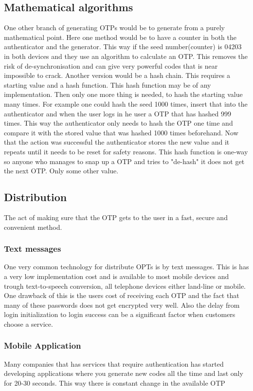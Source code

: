 \documentclass{article}
\begin{document}
            \subsection{Mathematical algorithms}
            One other branch of generating OTPs would be to generate from a purely mathematical point. Here one method would be to have a counter in both the authenticator and the generator. 
            This way if the seed number(counter) is 04203 in both devices and they use an algorithm to calculate an OTP. This removes the risk of de-synchronisation and can give very powerful codes that is near impossible to crack.
            Another version would be a hash chain. This requires a starting value and a hash function. This hash function may be of any implementation. Then only one more thing is needed, to hash the starting value many times. For example one could hash the seed 1000 times, insert that into the authenticator and when the user logs in he user a OTP that has hashed 999 times. This way the authenticator only needs to hash the OTP one time and compare it with the stored value that was hashed 1000 times beforehand. Now that the action was successful the authenticator stores the new value and it repeats until it needs to be reset for safety reasons.\cite{OTP-system}
            This hash function is one-way so anyone who manages to snap up a OTP and tries to "de-hash" it does not get the next OTP. Only some other value.
        \subsection{Distribution}
        The act of making sure that the OTP gets to the user in a fast, secure and convenient method.
            \subsubsection{Text messages}
            One very common technology for distribute OPTs is by text messages. This is has a very low implementation cost and is available to most mobile devices and trough text-to-speech conversion, all telephone devices either land-line or mobile.
            One drawback of this is the users cost of receiving each OTP and the fact that many of these passwords does not get encrypted very well. Also the delay from login initialization to login success can be a significant factor when customers choose a service.
            \subsubsection{Mobile Application} 	
            Many companies that has services that require authentication has started developing applications where you generate new codes all the time and last only for 20-30 seconds. This way there is constant change in the available OTP
\end{document}

